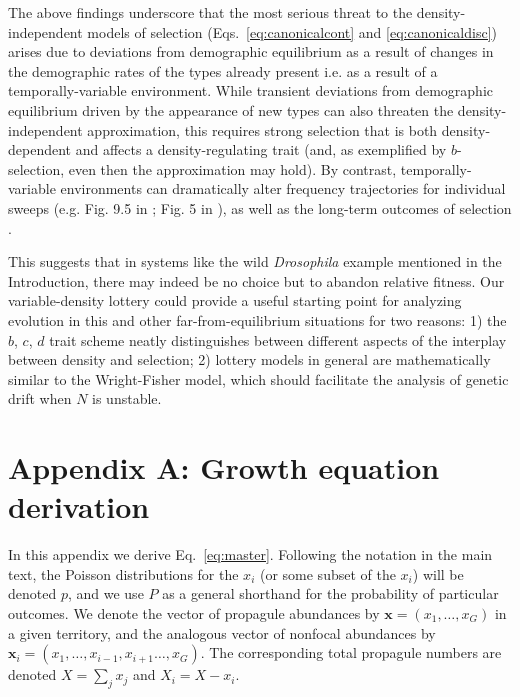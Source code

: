 \documentclass[12pt]{article}
\begin{document}
The above findings underscore that the most serious threat to the density-independent models of selection (Eqs.~\eqref{eq:canonicalcont} and \eqref{eq:canonicaldisc}) arises due to deviations from demographic equilibrium as a result of changes in the demographic rates of the types already present i.e. as a result of a temporally-variable environment. While transient deviations from demographic equilibrium driven by the appearance of new types can also threaten the density-independent approximation, this requires strong selection that is both density-dependent and affects a density-regulating trait (and, as exemplified by $b$-selection, even then the approximation may hold). By contrast, temporally-variable environments can dramatically alter frequency trajectories for individual sweeps (e.g. Fig. 9.5 in \cite{otto_2011}; Fig. 5 in \cite{mallet_2012}), as well as the long-term outcomes of selection \citep{lande_2009}. 

This suggests that in systems like the wild \textit{Drosophila} example mentioned in the Introduction, there may indeed be no choice but to abandon relative fitness. Our variable-density lottery could provide a useful starting point for analyzing evolution in this and other far-from-equilibrium situations for two reasons: 1) the $b$, $c$, $d$ trait scheme neatly distinguishes between different aspects of the interplay between density and selection; 2) lottery models in general are mathematically similar to the Wright-Fisher model, which should facilitate the analysis of genetic drift when $N$ is unstable.


 

\section*{Appendix A: Growth equation derivation}

In this appendix we derive Eq.~\eqref{eq:master}. Following the notation in the main text, the Poisson distributions for the $x_i$ (or some subset of the $x_i$) will be denoted $p$, and we use $P$ as a general shorthand for the probability of particular outcomes. We denote the vector of propagule abundances by ${\mathbf x} = (x_1,\ldots,x_G)$ in a given territory, and the analogous vector of nonfocal abundances by ${\mathbf x_i}=(x_1,\ldots,x_{i-1},x_{i+1}\ldots,x_G)$. The corresponding total propagule numbers are denoted $X=\sum_j x_j$ and $X_i=X-x_i$.
\end{document}
